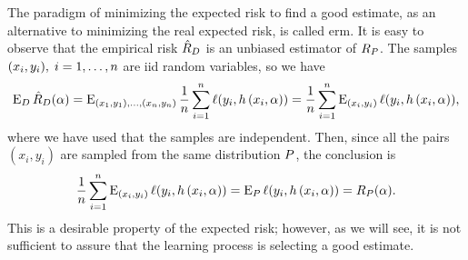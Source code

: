 %
The paradigm of minimizing the expected risk to find a good estimate, as an alternative to minimizing the real expected risk, is called \acrfull{erm}.
%
It is easy to observe that the empirical risk $\hat{R}_D$ is an unbiased estimator of $R_P$. The samples $(x_i, y_i), \; i=1, \ldots, n$ are \acrfull{iid} random variables, so we have 
\begin{equation}
    \nonumber
     \operatorname{E}_D \hat{R}_D(\alpha) = \operatorname{E}_{(x_1, y_1), \ldots, (x_n, y_n)} \frac{1}{n} \sum_{i=1}^n \ell(y_i, h\left(x_i, \alpha\right)) = \frac{1}{n} \sum_{i=1}^n \operatorname{E}_{(x_i, y_i)} \ell(y_i, h\left(x_i, \alpha\right)),
\end{equation}
where we have used that the samples are independent.
Then, since all the pairs $(x_i, y_i)$ are sampled from the same distribution $P$, the conclusion is 
\begin{equation}
    \nonumber
    \frac{1}{n} \sum_{i=1}^n \operatorname{E}_{(x_i, y_i)} \ell(y_i, h\left(x_i, \alpha\right)) = \operatorname{E}_{P} \ell(y_i, h\left(x_i, \alpha\right)) = R_P(\alpha) .
\end{equation}
This is a desirable property of the expected risk; however, as we will see, it is not sufficient to assure that the learning process is selecting a good estimate.

